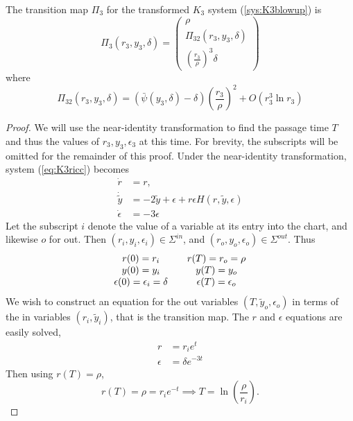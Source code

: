 \begin{prop}
	The transition map $\Pi_3$ for the transformed $K_3$ system (\ref{sys:K3blowup}) is
	$$ \Pi_3(r_3,y_3,\delta) = \begin{pmatrix}
	\rho \\ 
	\Pi_{32}(r_3,y_3,\delta) \\ 
	\left(\frac{r_3}{\rho}\right)^3\delta
	\end{pmatrix} $$ 
	where $$\Pi_{32}(r_3,y_3,\delta)=\left(\bar{\psi}(y_3,\delta)-\delta\right)\left(\frac{r_3}{\rho}\right)^2 + O(r^3_3\ln r_3)$$
\end{prop}
\begin{proof}
	We will use the near-identity transformation to find the passage time $T$ and thus the values of $r_3,y_3,\epsilon_3$ at this time. For brevity, the subscripts will be omitted for the remainder of this proof. Under the near-identity transformation, system (\ref{eq:K3ricc}) becomes
	\begin{subequations}
		\begin{align}
		\dot{r} &= r,\label{sys:K3riccNIr}\\
		\dot{\tilde{y}}&=-2\tilde{y}+\epsilon+r\epsilon H(r,\tilde{y},\epsilon)\label{sys:K3riccNIy}\\
		\dot{\epsilon} &= -3\epsilon
		\label{sys:K3riccNIeps}
		\end{align}
	\end{subequations}
	Let the subscript $i$ denote the value of a variable at its entry into the chart, and likewise $o$ for out. Then $(r_i,y_i,\epsilon_i)\in \Sigma^{in}$, and $(r_o,y_o,\epsilon_o)\in \Sigma^{out}$. Thus 
	$$\begin{array}{c c c}
	r(0)=r_i & &r(T)=r_o=\rho\\
	y(0)=y_i & &y(T)=y_o\\
	\epsilon(0)=\epsilon_i=\delta& & \epsilon(T)=\epsilon_o
	\end{array}
	$$
	We wish to construct an equation for the out variables $(T,\tilde{y}_o,\epsilon_o)$ in terms of the in variables $ (r_i,\tilde{y}_i) $, that is the transition map. The $r$ and $\epsilon$ equations are easily solved,
	\begin{align}
	r&=r_ie^t \\
	\epsilon&=\delta e^{-3t}
	\end{align}
	Then using $r(T)=\rho$, 
	$$r(T)=\rho=r_ie^{-t} \implies T=\ln\left(\frac{\rho}{r_i}\right).$$
	

\end{proof}

